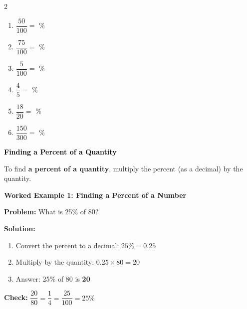 \documentclass[12pt, letterpaper, fleqn]{article}
\newcommand{\blankshorter}{\underline{\hspace{1.5cm}}}
\begin{document}
\begin{multicols}{2}
\begin{enumerate}[itemsep=1.2cm, leftmargin=0.6cm]
\item $\dfrac{50}{100} = $ \blankshorter \; \%
\vspace{1.5cm}
\item $\dfrac{75}{100} = $ \blankshorter \; \%
\vspace{1.5cm}
\item $\dfrac{5}{100} = $ \blankshorter \; \%
\vspace{1.5cm}
\item $\dfrac{4}{5} = $ \blankshorter \; \%
\vspace{1.5cm}
\item $\dfrac{18}{20} = $ \blankshorter \; \%
\vspace{1.5cm}
\item $\dfrac{150}{300} = $ \blankshorter \; \%
\vspace{1.5cm}

\end{enumerate}
\end{multicols}

\newpage



\begin{tcolorbox}[colback=customteal!20]
\large\textcolor{black}{\textbf{Finding a Percent of a Quantity}}
\end{tcolorbox}

\noindent
To find \textbf{a percent of a quantity}, multiply the percent (as a decimal) by the quantity.

\vspace{3mm}

\begin{tcolorbox}[colback=white, colframe=black!25, boxrule=0.6pt, arc=4mm, left=6mm, right=6mm, top=5mm, bottom=5mm]

\textbf{Worked Example 1: Finding a Percent of a Number}

\medskip

\textbf{Problem:} What is 25\% of 80?

\medskip

\noindent
\textbf{Solution:}

\begin{enumerate}
    \item Convert the percent to a decimal: $25\% = 0.25$
    
    \item Multiply by the quantity: $0.25 \times 80 = 20$
    
    \item Answer: 25\% of 80 is \textbf{20}
\end{enumerate}

\medskip

\noindent
\textbf{Check:} $\dfrac{20}{80} = \dfrac{1}{4} = \dfrac{25}{100} = 25\%$ 

\end{tcolorbox}
\end{document}
